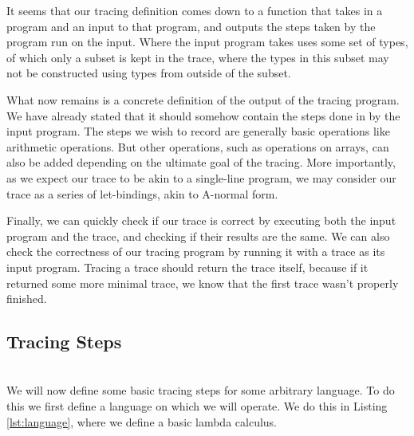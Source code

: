     It seems that our tracing definition comes down to a function that takes in a program and an input to that program, and outputs the steps taken by the program run on the input.
    Where the input program takes uses some set of types, of which only a subset is kept in the trace, where the types in this subset may not be constructed using types from outside of the subset.

    What now remains is a concrete definition of the output of the tracing program.
    We have already stated that it should somehow contain the steps done in by the input program.
    The steps we wish to record are generally basic operations like arithmetic operations.
    But other operations, such as operations on arrays, can also be added depending on the ultimate goal of the tracing.
    More importantly, as we expect our trace to be akin to a single-line program, we may consider our trace as a series of let-bindings, akin to A-normal form\cn.
    
    
    Finally, we can quickly check if our trace is correct by executing both the input program and the trace, and checking if their results are the same.
    We can also check the correctness of our tracing program by running it with a trace as its input program.
    Tracing a trace should return the trace itself, because if it returned some more minimal trace, we know that the first trace wasn't properly finished.

    \subsection{Tracing Steps}
        \\
        We will now define some basic tracing steps for some arbitrary language.
        To do this we first define a language on which we will operate.
        We do this in Listing \ref{lst:language}, where we define a basic lambda calculus.

